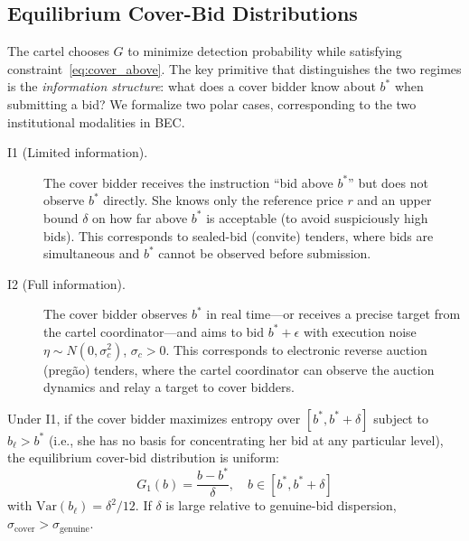 
\subsection{Equilibrium Cover-Bid Distributions}
\label{sec:cover_distributions}

The cartel chooses $G$ to minimize detection probability while
satisfying constraint~\eqref{eq:cover_above}. The key primitive that
distinguishes the two regimes is the \emph{information structure}:
what does a cover bidder know about $b^*$ when submitting a bid? We
formalize two polar cases, corresponding to the two institutional
modalities in BEC.

\begin{description}
  \item[I1 (Limited information).] The cover bidder receives the
    instruction ``bid above $b^*$'' but does not observe $b^*$
    directly. She knows only the reference price $r$ and an upper
    bound $\delta$ on how far above $b^*$ is acceptable (to avoid
    suspiciously high bids). This corresponds to sealed-bid
    (convite) tenders, where bids are simultaneous and $b^*$
    cannot be observed before submission.

  \item[I2 (Full information).] The cover bidder observes $b^*$ in
    real time---or receives a precise target from the cartel
    coordinator---and aims to bid $b^* + \epsilon$ with execution
    noise $\eta \sim N(0, \sigma_c^2)$, $\sigma_c > 0$. This
    corresponds to electronic reverse auction (preg\~ao) tenders,
    where the cartel coordinator can observe the auction dynamics
    and relay a target to cover bidders.
\end{description}

\begin{proposition}
\label{prop:regime1}
Under I1, if the cover bidder maximizes entropy over $[b^*, b^* +
\delta]$ subject to $b_\ell > b^*$ (i.e., she has no basis for
concentrating her bid at any particular level), the equilibrium
cover-bid distribution is uniform:
\begin{equation}
  G_1(b) = \frac{b - b^*}{\delta}, \quad b \in [b^*, b^* + \delta]
  \label{eq:regime1}
\end{equation}
with $\text{Var}(b_\ell) = \delta^2 / 12$. If $\delta$ is large
relative to genuine-bid dispersion,
$\sigma_{\text{cover}} > \sigma_{\text{genuine}}$.
\end{proposition}

